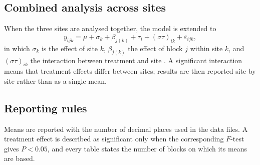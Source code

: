 \subsection{Combined analysis across sites}
When the three sites are analysed together, the model is extended to
\begin{equation}
  y_{ijk} = \mu + \sigma_k + \beta_{j(k)} + \tau_i + (\sigma\tau)_{ik} + \varepsilon_{ijk},
  \label{eq:combined}
\end{equation}
in which $\sigma_k$ is the effect of site $k$, $\beta_{j(k)}$ the effect of
block $j$ within site $k$, and $(\sigma\tau)_{ik}$ the interaction between
treatment and site \parencite{gomez1984}. A significant interaction means that
treatment effects differ between sites; results are then reported site by site
rather than as a single mean.

\subsection{Reporting rules}
Means are reported with the number of decimal places used in the data files.
A treatment effect is described as significant only when the corresponding
$F$-test gives $P < 0.05$, and every table states the number of blocks on
which its means are based.
